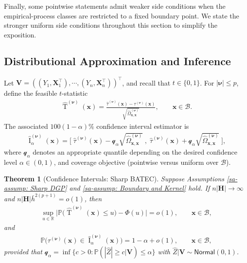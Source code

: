 \documentclass[10pt]{article}
\newtheorem{thm}{Theorem}
\DeclareMathOperator{\Tstat}{T}
\DeclareMathOperator{\CI}{I}
\renewcommand{\P}{\mathbb{P}}
\newcommand{\reals}{\mathbb{R}}
\newcommand{\bH}{\mathbf{H}}
\newcommand{\bV}{\mathbf{V}}
\newcommand{\bx}{\mathbf{x}}
\newcommand{\bX}{\mathbf{X}}
\newcommand{\bnu}{\boldsymbol{\nu}}
\newcommand{\B}{\mathcal{B}}
\newcommand{\q}{\mathcal{q}}
\begin{document}
Finally, some pointwise statements admit weaker side conditions when the empirical-process classes are restricted to a fixed boundary point. We state the stronger uniform side conditions throughout this section to simplify the exposition.

\subsection{Distributional Approximation and Inference}

Let $\bV = ((Y_1, \bX_1^{\top}), \cdots, (Y_n, \bX_n^{\top}))^\top$, and recall that $t \in \{0,1\}$. For $|\bnu| \leq p$, define the feasible $t$-statistic
\begin{align*}
    \widehat{\Tstat}^{(\bnu)}(\bx)
    = \frac{\widehat{\tau}^{(\bnu)}(\bx) - \tau^{(\bnu)}(\bx)}{\sqrt{\widehat{\Omega}_{\bx,\bx}^{(\bnu)}}},
    \qquad \bx \in \B.
\end{align*}
The associated $100(1-\alpha)\%$ confidence interval estimator is
\begin{align*}
    \widehat{\CI}^{(\bnu)}_{\alpha}(\bx)
    = \bigg[\;\widehat{\tau}^{(\bnu)}(\bx) - \q_{\alpha} \sqrt{\widehat{\Omega}_{\bx,\bx}^{(\bnu)}}
            \; , \;
              \widehat{\tau}^{(\bnu)}(\bx) + \q_{\alpha} \sqrt{\widehat{\Omega}_{\bx,\bx}^{(\bnu)}}\;\bigg],
\end{align*}
where $\q_{\alpha}$ denotes an appropriate quantile depending on the desired confidence level $\alpha\in(0,1)$, and coverage objective (pointwise versus uniform over $\B$).

\begin{thm}[Confidence Intervals: Sharp BATEC]\label{sa-thm: Confidence Intervals: Sharp BATEC}
    Suppose Assumptions \ref{sa-assump: Sharp DGP} and \ref{sa-assump: Boundary and Kernel} hold. If $n |\bH| \to \infty$ and $n |\bH| \bar{h}^{2(p+1)} =o(1)$, then
    \begin{align*}
        \sup_{u \in \reals} \big|\P \big(\widehat{\Tstat}^{(\bnu)}(\bx) \leq u \big) - \Phi(u)\big| = o(1),
        \qquad \bx \in \B,
    \end{align*}
    and
    \begin{align*}
        \P \big(\tau^{(\bnu)}(\bx) \in \widehat{\CI}_{\alpha}^{(\bnu)}(\bx) \big) = 1 - \alpha + o(1),
        \qquad \bx \in \B,
    \end{align*}
    provided that $\q_{\alpha} = \inf \{c > 0: \P( |\widehat{Z}| \geq c | \bV) \leq \alpha \}$ with $\widehat{Z}|\bV \sim \mathsf{Normal}(0, 1)$.
\end{thm}
\end{document}

